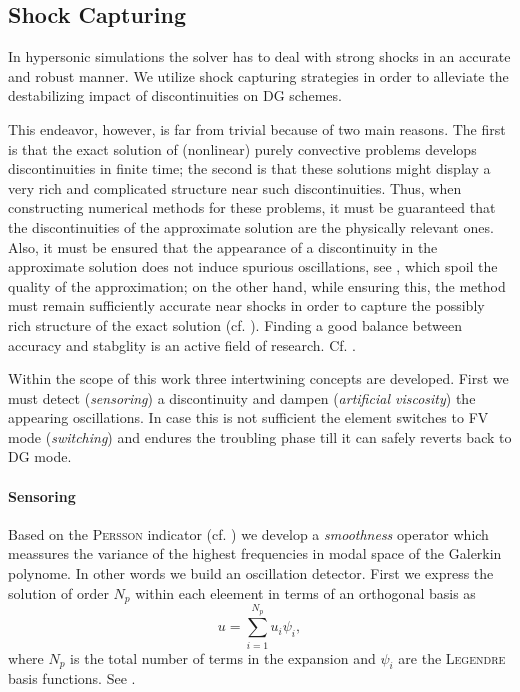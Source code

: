 \subsection{Shock Capturing}
\label{sec:shock-capturing}

In hypersonic simulations the solver has to deal with strong shocks in an
accurate and robust manner. We utilize shock capturing strategies in order to
alleviate the destabilizing impact of discontinuities on DG schemes.

This endeavor, however, is far from trivial because of two main reasons.  The
first is that the exact solution of (nonlinear) purely convective problems
develops discontinuities in finite time; the second is that these solutions
might display a very rich and complicated structure near such discontinuities.
Thus, when constructing numerical methods for these problems, it must be
guaranteed that the discontinuities of the approximate solution are the
physically relevant ones. Also, it must be ensured that the appearance of a
discontinuity in the approximate solution does not induce spurious
oscillations, see , which spoil the quality of
the approximation; on the other hand, while ensuring this, the method must
remain sufficiently accurate near shocks in order to capture the possibly rich
structure of the exact solution (cf.  ). Finding a good
balance between accuracy and stabglity is an active field of research. Cf.
\cite{atkins2011robust,lo2010high,kurganov2012new}.

Within the scope of this work three intertwining concepts are developed.  First
we must detect (\emph{sensoring}) a discontinuity and dampen (\emph{artificial
viscosity}) the appearing oscillations. In case this is not sufficient the
element switches to FV mode (\emph{switching}) and endures the troubling
phase till it can safely reverts back to DG mode.

\paragraph{Sensoring}
Based on the \textsc{Persson} indicator (cf. \cite{persson_peraire_2006}) we
develop a \emph{smoothness} operator which meassures the variance of the
highest frequencies in modal space of the Galerkin polynome. In other words we
build an oscillation detector.  First we express the solution of order $N_p$
within each eleement in terms of an orthogonal basis as
\begin{equation}
    u = \sum^{N_p}_{i=1} u_i \psi_i,
\end{equation}
where $N_p$ is the total number of terms in the expansion and $\psi_i$ are the
\textsc{Legendre} basis functions. See .

